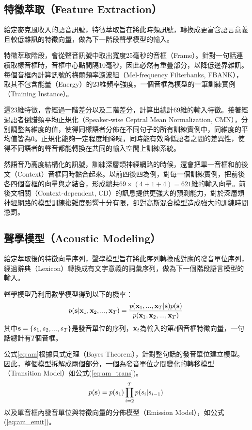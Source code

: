 \subsection{特徵萃取（Feature Extraction）}
給定麥克風收入的語音訊號，特徵萃取旨在將此時頻訊號，轉換成更富含語言意義且較低雜訊的特徵向量，做為下一階段聲學模型的輸入。

特徵萃取階段，會從聲音訊號中取出寬度25毫秒的音框（Frame）。針對一句話連續取樣音框時，音框中心點間隔10毫秒，因此必然有重疊部分，以降低邊界雜訊。每個音框內計算訊號的梅爾頻率濾波組（Mel-frequency Filterbanks, FBANK），取其不包含能量（Energy）的23維頻率強度。一個音框為模型的一筆訓練實例（Training Instance）。

這23維特徵，會經過一階差分以及二階差分，計算出總計69維的輸入特徵。接著經過語者倒譜頻平均正規化（Speaker-wise Ceptral Mean Normalization, CMN），分別調整各維度的值，使得同樣語者分佈在不同句子的所有訓練實例中，同維度的平均值皆為0。正規化能夠一定程度地降噪，同時能有效降低語者之間的差異性，使得不同語者的聲音都能轉換在共同的輸入空間上訓練系統。

然語音乃高度結構化的訊號，訓練深層類神經網路的時候，還會把單一音框和前後文（Context）音框同時黏合起來。以前四後四為例，對每一個訓練實例，把前後各四個音框的向量與之結合，形成總共$69 \times (4 + 1 + 4) = 621$維的輸入向量。前後文相關（Context-dependent, CD）的訊息提供更強大的預測能力，對於深層類神經網路的模型訓練複雜度影響十分有限，卻對高斯混合模型造成強大的訓練時間懲罰。

\subsection{聲學模型（Acoustic Modeling）}
給定萃取後的特徵向量序列，聲學模型旨在將此序列轉換成對應的發音單位序列，經過辭典（Lexicon）轉換成有文字意義的詞彙序列，做為下一個階段語言模型的輸入。

聲學模型乃利用數學模型得到以下的機率：
\begin{equation}\label{eq:am}
p( \bold{s} | \bold{x}_1 , \bold{x}_2 , ... , \bold{x}_T ) = \frac{ p( \bold{x}_1 , ... , \bold{x}_T | \bold{s} )p( \bold{s} )}{ p( \bold{x}_1 , \bold{x}_2 , ... , \bold{x}_T ) }
\end{equation}
其中$\bold{s} = \{s_1 , s_2 , ... , s_T \}$是發音單位的序列，$\bold{x}_t$為輸入的第$t$個音框特徵向量，一句話總計有$T$個音框。

公式\ref{eq:am}根據貝式定理（Bayes Theorem），針對整句話的發音單位建立模型。因此，整個模型拆解成兩個部分，一個為發音單位之間變化的轉移模型（Transition Model）如公式(\ref{eq:am_trans})。
\begin{equation}\label{eq:am_trans}
p( \bold{s}) = p(s_1)\prod_{i=2}^{T} { p( s_i | s_{i-1} ) } 
\end{equation}
以及單音框內發音單位與特徵向量的分佈模型（Emission Model），如公式(\ref{eq:am_emit})。

